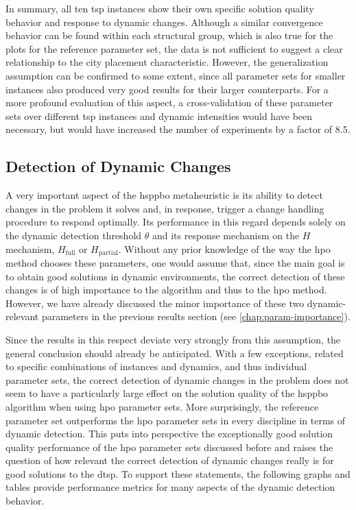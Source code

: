 In summary, all ten \gls{tsp} instances show their own specific solution quality behavior and response to dynamic changes. Although a similar convergence behavior can be found within each structural group, which is also true for the plots for the reference parameter set, the data is not sufficient to suggest a clear relationship to the city placement characteristic. However, the generalization assumption can be confirmed to some extent, since all parameter sets for smaller instances also produced very good results for their larger counterparts. For a more profound evaluation of this aspect, a cross-validation of these parameter sets over different \gls{tsp} instances and dynamic intensities would have been necessary, but would have increased the number of experiments by a factor of 8.5. 

\subsection{Detection of Dynamic Changes}

A very important aspect of the \gls{hsppbo} metaheuristic is its ability to detect changes in the problem it solves and, in response, trigger a change handling procedure to respond optimally. Its performance in this regard depends solely on the dynamic detection threshold $\theta$ and its response mechanism on the $H$ mechanism, $H_\text{full}$ or $H_\text{partial}$. Without any prior knowledge of the way the \gls{hpo} method chooses these parameters, one would assume that, since the main goal is to obtain good solutions in dynamic environments, the correct detection of these changes is of high importance to the algorithm and thus to the \gls{hpo} method.
However, we have already discussed the minor importance of these two dynamic-relevant parameters in the previous results section (see \cref{chap:param-importance}).

Since the results in this respect deviate very strongly from this assumption, the general conclusion should already be anticipated.
With a few exceptions, related to specific combinations of instances and dynamics, and thus individual parameter sets, the correct detection of dynamic changes in the problem does not seem to have a particularly large effect on the solution quality of the \gls{hsppbo} algorithm when using \gls{hpo} parameter sets. More surprisingly, the reference parameter set outperforms the \gls{hpo} parameter sets in every discipline in terms of dynamic detection. This puts into perspective the exceptionally good solution quality performance of the \gls{hpo} parameter sets discussed before and raises the question of how relevant the correct detection of dynamic changes really is for good solutions to the \gls{dtsp}. To support these statements, the following graphs and tables provide performance metrics for many aspects of the dynamic detection behavior. 


